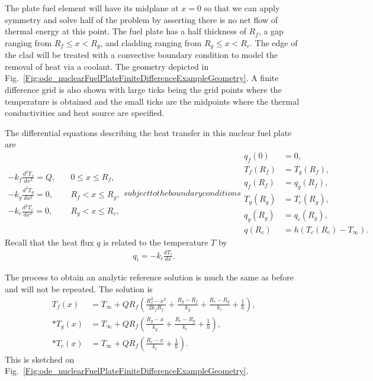 The plate fuel element will have its midplane at $x = 0$ so that we can apply symmetry and solve half of the problem by asserting there is no net flow of thermal energy at this point. The fuel plate has a half thickness of $R_f$, a gap ranging from $R_f \le x < R_g$, and cladding ranging from $R_g \le x < R_c$. The edge of the clad will be treated with a convective boundary condition to model the removal of heat via a coolant. The geometry depicted in Fig.~\ref{Fig:ode_nuclearFuelPlateFiniteDifferenceExampleGeometry}. A finite difference grid is also shown with large ticks being the grid points where the temperature is obtained and the small ticks are the midpoints where the thermal conductivities and heat source are specified.

The differential equations describing the heat transfer in this nuclear fuel plate are
\begin{subequations}
\begin{align}
  -k_f \frac{d^2 T_f}{dx^2} = Q, &\quad 0 \le x \le R_f, \\
  -k_g \frac{d^2 T_g}{dx^2} = 0, &\quad R_f < x \le R_g, \\ 
  -k_c \frac{d^2 T_c}{dx^2} = 0, &\quad R_g < x \le R_c,    
\end{align}
subject to the boundary conditions
\begin{align}
  q_f(0) &= 0, \\
  T_f(R_f) &= T_g(R_f), \\
  q_f(R_f) &= q_g(R_f), \\
  T_g(R_g) &= T_c(R_g), \\
  q_g(R_g) &= q_c(R_g), \\ 
  q(R_c) &= h ( T_c(R_c) - T_\infty ). 
\end{align}
\end{subequations}
Recall that the heat flux $q$ is related to the temperature $T$ by
\begin{align}
  q_i = -k_i \frac{dT_i}{dx}. \nonumber
\end{align}

The process to obtain an analytic reference solution is much the same as before and will not be repeated. The solution is
\begin{subequations}
\begin{align}
  T_f(x) &= T_\infty + Q R_f \left( \frac{R_f^2 - x^2}{2 k_f R_f} + \frac{R_g - R_f}{k_g} + \frac{R_c - R_g}{k_c} + \frac{1}{h}  \right), \\*
  T_g(x) &= T_\infty + Q R_f \left( \frac{R_g - x}{k_g} + \frac{R_c - R_g}{k_c} + \frac{1}{h}  \right), \\*
  T_c(x) &= T_\infty + Q R_f \left( \frac{R_c - x}{k_c} + \frac{1}{h} \right) .
\end{align}
\end{subequations}
This is sketched on Fig.~\ref{Fig:ode_nuclearFuelPlateFiniteDifferenceExampleGeometry}.

